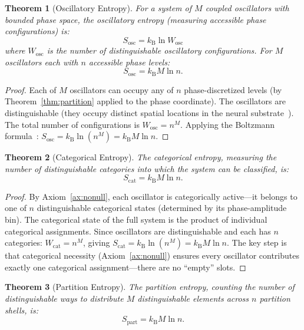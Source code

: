 \documentclass[10pt,twocolumn]{article}
\newtheorem{theorem}{Theorem}[section]
\theoremstyle{remark}
\newcommand{\kB}{k_{\mathrm{B}}}
\newcommand{\Sosc}{S_{\mathrm{osc}}}
\newcommand{\Scat}{S_{\mathrm{cat}}}
\newcommand{\Spart}{S_{\mathrm{part}}}
\begin{document}
\begin{theorem}[Oscillatory Entropy]
\label{thm:sosc}
For a system of $M$ coupled oscillators with bounded phase space, the oscillatory entropy (measuring accessible phase configurations) is:
\begin{equation}
\Sosc = \kB \ln W_{\mathrm{osc}}
\label{eq:sosc_def}
\end{equation}
where $W_{\mathrm{osc}}$ is the number of distinguishable oscillatory configurations. For $M$ oscillators each with $n$ accessible phase levels:
\begin{equation}
\Sosc = \kB M \ln n.
\label{eq:sosc}
\end{equation}
\end{theorem}

\begin{proof}
Each of $M$ oscillators can occupy any of $n$ phase-discretized levels (by Theorem~\ref{thm:partition} applied to the phase coordinate). The oscillators are distinguishable (they occupy distinct spatial locations in the neural substrate~\cite{buzsaki2006rhythms}). The total number of configurations is $W_{\mathrm{osc}} = n^M$. Applying the Boltzmann formula~\cite{boltzmann1896lectures,jaynes1957information}: $\Sosc = \kB \ln(n^M) = \kB M \ln n$.
\end{proof}

\begin{theorem}[Categorical Entropy]
\label{thm:scat}
The categorical entropy, measuring the number of distinguishable categories into which the system can be classified, is:
\begin{equation}
\Scat = \kB M \ln n.
\label{eq:scat}
\end{equation}
\end{theorem}

\begin{proof}
By Axiom~\ref{ax:nonull}, each oscillator is categorically active---it belongs to one of $n$ distinguishable categorical states (determined by its phase-amplitude bin). The categorical state of the full system is the product of individual categorical assignments. Since oscillators are distinguishable and each has $n$ categories: $W_{\mathrm{cat}} = n^M$, giving $\Scat = \kB \ln(n^M) = \kB M \ln n$. The key step is that categorical necessity (Axiom~\ref{ax:nonull}) ensures every oscillator contributes exactly one categorical assignment---there are no ``empty'' slots.
\end{proof}

\begin{theorem}[Partition Entropy]
\label{thm:spart}
The partition entropy, counting the number of distinguishable ways to distribute $M$ distinguishable elements across $n$ partition shells, is:
\begin{equation}
\Spart = \kB M \ln n.
\label{eq:spart}
\end{equation}
\end{theorem}
\end{document}
